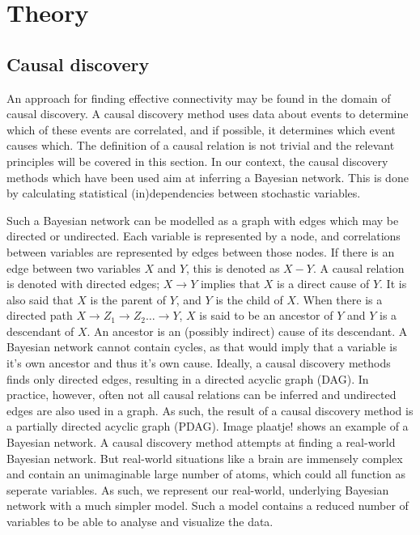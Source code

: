 \documentclass[a4paper, 10pt, english, onecolumn]{article}
\begin{document}
\section{Theory}

\subsection{Causal discovery}
An approach for finding effective connectivity may be found in the domain of causal discovery.
A causal discovery method uses data about events to determine which of these events are correlated, and if possible, it determines which event causes which.
The definition of a causal relation is not trivial \cite{} and the relevant principles will be covered in this section.
In our context, the causal discovery methods which have been used aim at inferring a Bayesian network.
This is done by calculating statistical (in)dependencies between stochastic variables.

Such a Bayesian network can be modelled as a graph with edges which may be directed or undirected.
Each variable is represented by a node, and correlations between variables are represented by edges between those nodes.
If there is an edge between two variables $X$ and $Y$, this is denoted as $X - Y$.
A causal relation is denoted with directed edges; $X \rightarrow Y$ implies that $X$ is a direct cause of $Y$.
It is also said that $X$ is the parent of $Y$, and $Y$ is the child of $X$. 
When there is a directed path $X \rightarrow Z_1 \rightarrow Z_2 \dots \rightarrow Y$, $X$ is said to be an ancestor of $Y$ and $Y$ is a descendant of $X$.
An ancestor is an (possibly indirect) cause of its descendant.
A Bayesian network cannot contain cycles, as that would imply that a variable is it's own ancestor and thus it's own cause.
Ideally, a causal discovery methods finds only directed edges, resulting in a directed acyclic graph (DAG).
In practice, however, often not all causal relations can be inferred and undirected edges are also used in a graph.
As such, the result of a causal discovery method is a partially directed acyclic graph (PDAG).
Image {plaatje!} shows an example of a Bayesian network.
A causal discovery method attempts at finding a real-world Bayesian network.
But real-world situations like a brain are immensely complex and contain an unimaginable large number of atoms, which could all function as seperate variables.
As such, we represent our real-world, underlying Bayesian network with a much simpler model.
Such a model contains a reduced number of variables to be able to analyse and visualize the data.
\end{document}

